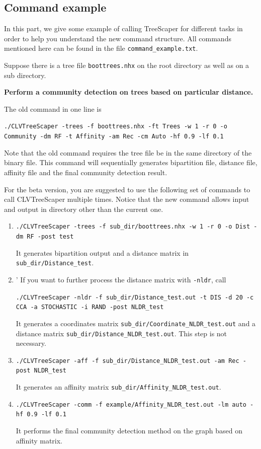 \documentclass[11pt,a4paper]{article}
\theoremstyle{definition}
\theoremstyle{definition}
\numberwithin{equation}{section}
\begin{document}
	\subsection{Command example}
	
	In this part, we give some example of calling TreeScaper for different tasks in order to help you understand the new command structure. All commands mentioned here can be found in the file \texttt{command\_example.txt}.
	
	Suppose there is a tree file \texttt{boottrees.nhx} on the root directory as well as on a sub directory. 
	
	\textbf{Perform a community detection on trees based on particular distance.}
	
	The old command in one line is
	
	\texttt{./CLVTreeScaper -trees -f boottrees.nhx -ft Trees -w 1 -r 0 -o Community -dm RF -t Affinity -am Rec -cm Auto -hf 0.9 -lf 0.1}
	
	Note that the old command requires the tree file be in the same directory of the binary file. This command will sequentially generates bipartition file, distance file, affinity file and the final community detection result.
	
	For the beta version, you are suggested to use the following set of commands to call CLVTreeScaper multiple times. Notice that the new command allows input and output in directory other than the current one.
	
	\begin{enumerate}
		\item \texttt{./CLVTreeScaper -trees -f sub\_dir/boottrees.nhx -w 1 -r 0 -o Dist -dm RF -post test}
		
		It generates bipartition output and a distance matrix in \texttt{sub\_dir/Distance\_test}.
		
		\item' If you want to further process the distance matrix with \texttt{-nldr}, call
		
		\texttt{./CLVTreeScaper -nldr -f sub\_dir/Distance\_test.out -t DIS -d 20 -c CCA -a STOCHASTIC -i RAND -post NLDR\_test}
		
		It generates a coordinates matrix \texttt{sub\_dir/Coordinate\_NLDR\_test.out} and a distance matrix \texttt{sub\_dir/Distance\_NLDR\_test.out}. This step is not necessary.
		
		\item \texttt{./CLVTreeScaper -aff -f sub\_dir/Distance\_NLDR\_test.out -am Rec -post NLDR\_test}
		
		It generates an affinity matrix \texttt{sub\_dir/Affinity\_NLDR\_test.out}.
		
		\item \texttt{./CLVTreeScaper -comm -f example/Affinity\_NLDR\_test.out -lm auto -hf 0.9 -lf 0.1}
		
		It performs the final community detection method on the graph based on affinity matrix. 
	\end{enumerate}
\end{document}
